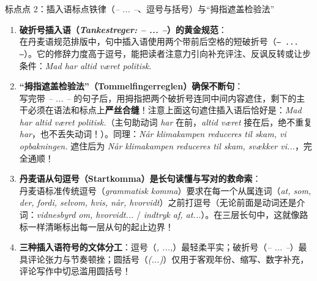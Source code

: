 \begin{grammatikbox}{标点点 2：插入语标点铁律（\textit{-- ... --}、逗号与括号）与“拇指遮盖检验法”}
\begin{enumerate}
  \item \textbf{破折号插入语（\textit{Tankestreger: -- ... --}）的黄金规范}：\\
    在丹麦语规范排版中，句中插入语使用两个带前后空格的短破折号（\texttt{-- ... --}）。它的修辞力度高于逗号，能把读者注意力引向补充评注、反讽反转或让步条件：\textit{Mad har  altid været politisk.}
  \item \textbf{“拇指遮盖检验法”（Tommelfingerreglen）确保不断句}：\\
    写完带 \textit{-- ... --} 的句子后，用拇指把两个破折号连同中间内容遮住，剩下的主干必须在语法和标点上\textbf{严丝合缝}！注意上面这句遮住插入语后恰好是：\textit{Mad har altid været politisk.}（主句助动词 \textit{har} 在前，\textit{altid været} 接在后，绝不重复 \textit{har}，也不丢失动词！）。同理：\textit{Når klimakampen  reduceres til skam,  vi opbakningen.} 遮住后为 \textit{Når klimakampen reduceres til skam, svækker vi...}，完全通顺！
  \item \textbf{丹麦语从句逗号（Startkomma）是长句读懂与写对的救命索}：\\
    丹麦语标准传统逗号（\textit{grammatisk komma}）要求在每一个从属连词（\textit{at, som, der, fordi, selvom, hvis, når, hvorvidt}）之前打逗号（无论前面是动词还是介词：\textit{vidnesbyrd om, hvorvidt...} / \textit{indtryk af, at...}）。在三层长句中，这就像路标一样清晰标出每一层从句的起止边界！
  \item \textbf{三种插入语符号的文体分工}：逗号（\textit{, ...,}）最轻柔平实；破折号（\textit{-- ... --}）最具评论张力与节奏顿挫；圆括号（\textit{(...)}）仅用于客观年份、缩写、数字补充，评论写作中切忌滥用圆括号！
\end{enumerate}
\end{grammatikbox}

